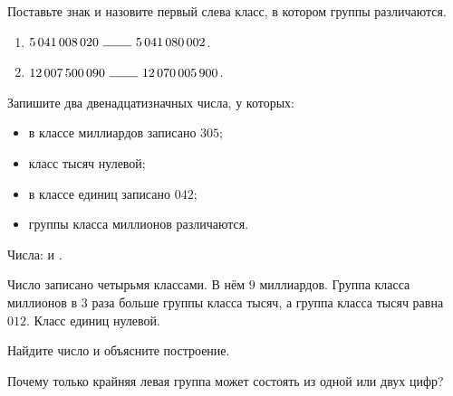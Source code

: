\begin{practicebox}
  Поставьте знак и назовите первый слева класс, в котором группы различаются.
  \begin{enumerate}[label=\textbf{\arabic*.}]
    \item \(5\,041\,008\,020\ \answerblank[8mm]\ 5\,041\,080\,002\).
    \item \(12\,007\,500\,090\ \answerblank[8mm]\ 12\,070\,005\,900\).
  \end{enumerate}
\end{practicebox}

\begin{practicebox}
  Запишите два двенадцатизначных числа, у которых:
  \begin{itemize}
    \item в классе миллиардов записано \(305\);
    \item класс тысяч нулевой;
    \item в классе единиц записано \(042\);
    \item группы класса миллионов различаются.
  \end{itemize}
  Числа: \answerblank[48mm] и \answerblank[48mm].
\end{practicebox}

\begin{practicebox}
  Число записано четырьмя классами. В нём \(9\) миллиардов. Группа класса
  миллионов в \(3\) раза больше группы класса тысяч, а группа класса тысяч
  равна \(012\). Класс единиц нулевой.

  Найдите число и объясните построение.
\end{practicebox}

\begin{reflectionbox}[Обобщите]
  Почему только крайняя левая группа может состоять из одной или двух цифр?
\end{reflectionbox}
